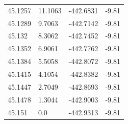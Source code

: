\begin{table}[H]
\begin{tabular}{llll}
45.1257 & 11.1063 & -442.6831 & -9.81 \\
45.1289 & 9.7063 & -442.7142 & -9.81 \\
45.132 & 8.3062 & -442.7452 & -9.81 \\
45.1352 & 6.9061 & -442.7762 & -9.81 \\
45.1384 & 5.5058 & -442.8072 & -9.81 \\
45.1415 & 4.1054 & -442.8382 & -9.81 \\
45.1447 & 2.7049 & -442.8693 & -9.81 \\
45.1478 & 1.3044 & -442.9003 & -9.81 \\
45.151 & 0.0 & -442.9313 & -9.81 \\
\bottomrule
\end{tabular}

\end{table}
